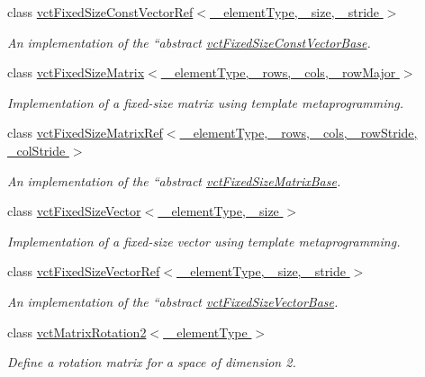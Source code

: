 \begin{DoxyCompactItemize}
class \hyperlink{classvct_fixed_size_const_vector_ref}{vct\+Fixed\+Size\+Const\+Vector\+Ref$<$ \+\_\+element\+Type, \+\_\+size, \+\_\+stride $>$}
\begin{DoxyCompactList}\small\item\em An implementation of the ``abstract\textquotesingle{}\textquotesingle{} \hyperlink{classvct_fixed_size_const_vector_base}{vct\+Fixed\+Size\+Const\+Vector\+Base}. \end{DoxyCompactList}\item 
class \hyperlink{classvct_fixed_size_matrix}{vct\+Fixed\+Size\+Matrix$<$ \+\_\+element\+Type, \+\_\+rows, \+\_\+cols, \+\_\+row\+Major $>$}
\begin{DoxyCompactList}\small\item\em Implementation of a fixed-\/size matrix using template metaprogramming. \end{DoxyCompactList}\item 
class \hyperlink{classvct_fixed_size_matrix_ref}{vct\+Fixed\+Size\+Matrix\+Ref$<$ \+\_\+element\+Type, \+\_\+rows, \+\_\+cols, \+\_\+row\+Stride, \+\_\+col\+Stride $>$}
\begin{DoxyCompactList}\small\item\em An implementation of the ``abstract\textquotesingle{}\textquotesingle{} \hyperlink{classvct_fixed_size_matrix_base}{vct\+Fixed\+Size\+Matrix\+Base}. \end{DoxyCompactList}\item 
class \hyperlink{classvct_fixed_size_vector}{vct\+Fixed\+Size\+Vector$<$ \+\_\+element\+Type, \+\_\+size $>$}
\begin{DoxyCompactList}\small\item\em Implementation of a fixed-\/size vector using template metaprogramming. \end{DoxyCompactList}\item 
class \hyperlink{classvct_fixed_size_vector_ref}{vct\+Fixed\+Size\+Vector\+Ref$<$ \+\_\+element\+Type, \+\_\+size, \+\_\+stride $>$}
\begin{DoxyCompactList}\small\item\em An implementation of the ``abstract\textquotesingle{}\textquotesingle{} \hyperlink{classvct_fixed_size_vector_base}{vct\+Fixed\+Size\+Vector\+Base}. \end{DoxyCompactList}\item 
class \hyperlink{classvct_matrix_rotation2}{vct\+Matrix\+Rotation2$<$ \+\_\+element\+Type $>$}
\begin{DoxyCompactList}\small\item\em Define a rotation matrix for a space of dimension 2. \end{DoxyCompactList}\item 

\end{DoxyCompactItemize}
